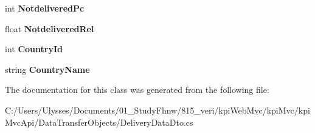 \begin{DoxyCompactItemize}
int {\bfseries Notdelivered\+Pc}
\item 
\mbox{\label{classkpi_mvc_api_1_1_data_transfer_objects_1_1_delivery_data_dto_a6bc54f620f5d5d89aa67ba81f401f8b2}} 
float {\bfseries Notdelivered\+Rel}
\item 
\mbox{\label{classkpi_mvc_api_1_1_data_transfer_objects_1_1_delivery_data_dto_afeae29ab82e6d8fc83f766328f25f98d}} 
int {\bfseries Country\+Id}
\item 
\mbox{\label{classkpi_mvc_api_1_1_data_transfer_objects_1_1_delivery_data_dto_ac8438c0ad672349a06d9eee773be83d5}} 
string {\bfseries Country\+Name}
\end{DoxyCompactItemize}


The documentation for this class was generated from the following file\+:\begin{DoxyCompactItemize}
\item 
C\+:/\+Users/\+Ulysses/\+Documents/01\+\_\+\+Study\+Fhnw/815\+\_\+veri/kpi\+Web\+Mvc/kpi\+Mvc/kpi\+Mvc\+Api/\+Data\+Transfer\+Objects/Delivery\+Data\+Dto.\+cs\end{DoxyCompactItemize}
